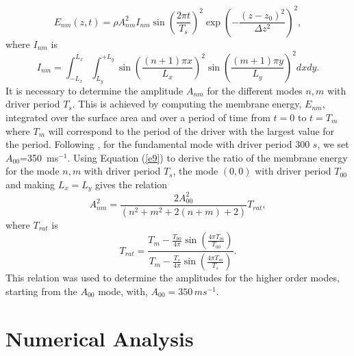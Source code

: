 \documentclass[preprint,authoryear,12pt]{elsarticle}
\begin{document}
\begin{equation}
E_{nm}(z,t)= \rho A_{nm}^{2} I_{nm}  \sin{\left(\frac{2\pi t}{T_s} \right)}^2
\exp{\left( -\frac{(z-z_0)^2}{\Delta z^{2}} \right)}^2,
\label{e9}
\end{equation}
where $I_{nm}$ is
$$
I_{nm}= \int_{-L_{x}}^{L_{x}} \int_{L_{y}}^{+L_{y}} \sin{\left(\frac{(n+1)\pi x}{L_x} \right)}^{2}   \sin{\left(  \frac{(m+1)\pi y}{L_y} \right)}^{2}dxdy. 
$$
It is necessary to determine the amplitude $A_{nm}$ for the different modes $n, m$ with driver period 
$T_{s}$. This is achieved by computing the membrane energy, $E_{nm}$, integrated over the surface area and 
over a period of time from $t=0$ to $t=T_{m}$ where $T_m$ will correspond to the period of the driver 
with the largest value for the period. Following  \citet{Leighton1960}, for the fundamental mode with 
driver period 300 $s$, we set $A_{00}$=350\, ms$^{-1}$. 
Using Equation (\ref{e9}) to derive the ratio of the membrane energy for the mode $n, m$ with 
driver period $T_{s}$, the mode $(0, 0)$ with driver period $T_{00}$ and making $L_x=L_y$ 
gives the relation
\begin{equation}
A_{nm}^{2}=\frac{2A_{00}^{2}}{(n^2+m^2+2(n+m)+2)}T_{rat},
\label{e10}
\end{equation}
where $T_{rat}$ is
$$
T_{rat}=
\frac{T_m-\frac{T_{00}}{4\pi}   \sin(\frac{4\pi T_m}{T_{00}})    }{T_m-\frac{T_{s}}{4\pi}   \sin(\frac{4\pi T_m}{T_{s}})}. 
$$
This relation was used to determine the amplitudes for the higher order modes, starting from the $A_{00}$ mode, with, $A_{00}=350\, ms^{-1}$.

\section{Numerical Analysis}
\end{document}
